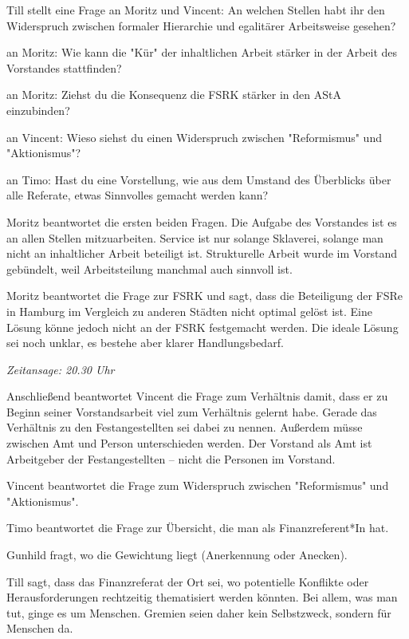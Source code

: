 \documentclass[ngerman,headheight=70pt]{scrartcl}
\begin{document}
    Till stellt eine Frage an Moritz und Vincent: An welchen Stellen habt
    ihr den Widerspruch zwischen formaler Hierarchie und egalitärer
    Arbeitsweise gesehen?

    an Moritz: Wie kann die "Kür" der inhaltlichen Arbeit stärker in der
    Arbeit des Vorstandes stattfinden?

    an Moritz: Ziehst du die Konsequenz die FSRK stärker in den AStA einzubinden?

    an Vincent: Wieso siehst du einen Widerspruch zwischen "Reformismus"
    und "Aktionismus"?

    an Timo: Hast du eine Vorstellung, wie aus dem Umstand des Überblicks
    über alle Referate, etwas Sinnvolles gemacht werden kann?

    Moritz beantwortet die ersten beiden Fragen. Die Aufgabe des Vorstandes
    ist es an allen Stellen mitzuarbeiten. Service ist nur solange Sklaverei,
    solange man nicht an inhaltlicher Arbeit beteiligt ist. Strukturelle
    Arbeit wurde im Vorstand gebündelt, weil Arbeitsteilung manchmal auch
    sinnvoll ist.

    Moritz beantwortet die Frage zur FSRK und sagt, dass die Beteiligung der FSRe
    in Hamburg im Vergleich zu anderen Städten nicht optimal gelöst ist. Eine
    Lösung könne jedoch nicht an der FSRK festgemacht werden. Die ideale Lösung
    sei noch unklar, es bestehe aber klarer Handlungsbedarf.

    \textit{Zeitansage: 20.30 Uhr}

    Anschließend beantwortet Vincent die Frage zum Verhältnis damit, dass er
    zu Beginn seiner Vorstandsarbeit viel zum Verhältnis gelernt habe.
    Gerade das Verhältnis zu den Festangestellten sei dabei zu nennen.
    Außerdem müsse zwischen Amt und Person unterschieden werden. Der Vorstand als
    Amt ist Arbeitgeber der Festangestellten -- nicht die Personen im Vorstand.

    Vincent beantwortet die Frage zum Widerspruch zwischen "Reformismus"
    und "Aktionismus".

    Timo beantwortet die Frage zur Übersicht, die man als Finanzreferent*In
    hat.

    Gunhild fragt, wo die Gewichtung liegt (Anerkennung oder Anecken).

    Till sagt, dass das Finanzreferat der Ort sei, wo potentielle Konflikte
    oder Herausforderungen rechtzeitig thematisiert werden könnten.
    Bei allem, was man tut, ginge es um Menschen. Gremien seien daher kein
    Selbstzweck, sondern für Menschen da.
\end{document}
